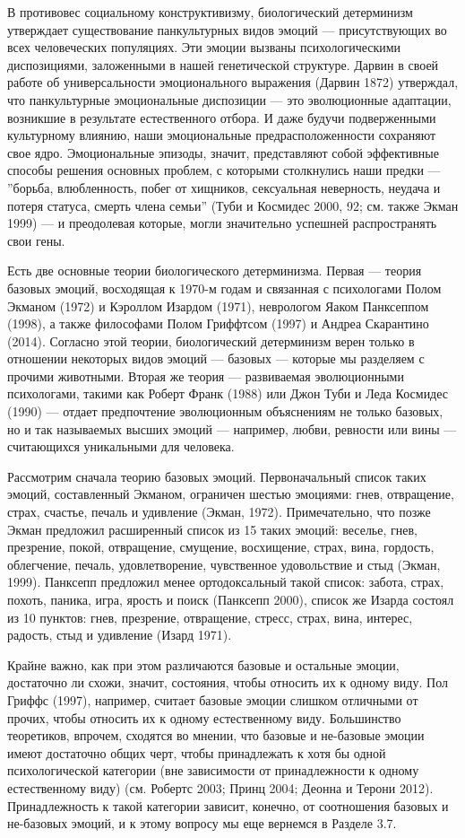 \documentclass[11pt]{book}
\begin{document}
В противовес социальному конструктивизму, биологический детерминизм утверждает существование панкультурных видов эмоций --- присутствующих во всех человеческих популяциях. Эти эмоции вызваны психологическими диспозициями, заложенными в нашей генетической структуре. Дарвин в своей работе об универсальности эмоционального выражения (Дарвин 1872) утверждал, что панкультурные эмоциональные диспозиции --- это эволюционные адаптации, возникшие в результате естественного отбора. И даже будучи подверженными культурному влиянию, наши эмоциональные предрасположенности сохраняют свое ядро. Эмоциональные эпизоды, значит, представляют собой эффективные способы решения основных проблем, с которыми столкнулись наши предки --- ''борьба, влюбленность, побег от хищников, сексуальная неверность, неудача и потеря статуса, смерть члена семьи'' (Туби и Космидес 2000, 92; см. также Экман 1999) --- и преодолевая которые, могли значительно успешней распространять свои гены.

Есть две основные теории биологического детерминизма. Первая --- теория базовых эмоций, восходящая к 1970-м годам и связанная с психологами Полом Экманом (1972) и Кэроллом Изардом (1971), неврологом Яаком Панксеппом (1998), а также философами Полом Гриффтсом (1997) и Андреа Скарантино (2014). Согласно этой теории, биологический детерминизм верен только в отношении некоторых видов эмоций --- базовых --- которые мы разделяем с прочими животными. Вторая же теория --- развиваемая эволюционными психологами, такими как Роберт Франк (1988) или Джон Туби и Леда Космидес (1990) --- отдает предпочтение эволюционным объяснениям не только базовых, но и так называемых высших эмоций --- например, любви, ревности или вины --- считающихся уникальными для человека.

Рассмотрим сначала теорию базовых эмоций. Первоначальный список таких эмоций, составленный Экманом, ограничен шестью эмоциями: гнев, отвращение, страх, счастье, печаль и удивление (Экман, 1972). Примечательно, что позже Экман предложил расширенный список из 15 таких эмоций: веселье, гнев, презрение, покой, отвращение, смущение, восхищение, страх, вина, гордость, облегчение, печаль, удовлетворение, чувственное удовольствие и стыд (Экман, 1999). Панксепп предложил менее ортодоксальный такой список: забота, страх, похоть, паника, игра, ярость и поиск (Панксепп 2000), список же Изарда состоял из 10 пунктов: гнев, презрение, отвращение, стресс, страх, вина, интерес, радость, стыд и удивление (Изард 1971).

Крайне важно, как при этом различаются базовые и остальные эмоции, достаточно ли схожи, значит, состояния, чтобы относить их к одному виду. Пол Гриффс (1997), например, считает базовые эмоции слишком отличными от прочих, чтобы относить их к одному естественному виду. Большинство теоретиков, впрочем, сходятся во мнении, что базовые и не-базовые эмоции имеют достаточно общих черт, чтобы принадлежать к хотя бы одной психологической категории (вне зависимости от принадлежности к одному естественному виду) (см. Робертс 2003; Принц 2004; Деонна и Терони 2012). Принадлежность к такой категории зависит, конечно, от соотношения базовых и не-базовых эмоций, и к этому вопросу мы еще вернемся в Разделе 3.7.
\end{document}
